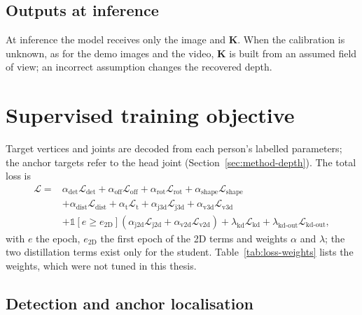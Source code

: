 \subsection{Outputs at inference}
\label{sec:method-inference}

At inference the model receives only the image and $\mathbf K$. When the calibration is unknown, as for the
demo images and the video, $\mathbf K$ is built from an assumed field of view; an incorrect assumption changes
the recovered depth.

\section{Supervised training objective}
\label{sec:method-losses}

Target vertices and joints are decoded from each person's labelled parameters; the anchor targets refer to the head
joint (Section~\ref{sec:method-depth}). The total loss is
\begin{equation}
\begin{split}
 \mathcal{L}={}&\alpha_{\text{det}}\mathcal{L}_{\text{det}}+\alpha_{\text{off}}\mathcal{L}_{\text{off}}
 +\alpha_{\text{rot}}\mathcal{L}_{\text{rot}}+\alpha_{\text{shape}}\mathcal{L}_{\text{shape}}\\
 &+\alpha_{\text{dist}}\mathcal{L}_{\text{dist}}+\alpha_{\text{t}}\mathcal{L}_{\text{t}}
 +\alpha_{\text{j3d}}\mathcal{L}_{\text{j3d}}+\alpha_{\text{v3d}}\mathcal{L}_{\text{v3d}}\\
 &+\mathbb{1}[e\ge e_{\text{2D}}]\left(\alpha_{\text{j2d}}\mathcal{L}_{\text{j2d}}
 +\alpha_{\text{v2d}}\mathcal{L}_{\text{v2d}}\right)
 +\lambda_{\text{kd}}\mathcal{L}_{\text{kd}}+\lambda_{\text{kd-out}}\mathcal{L}_{\text{kd-out}},
\end{split}
\label{eq:method-loss}
\end{equation}
with $e$ the epoch, $e_{\text{2D}}$ the first epoch of the 2D terms and weights $\alpha$ and $\lambda$; the two
distillation terms exist only for the student. Table~\ref{tab:loss-weights} lists the weights, which were not tuned in
this thesis.



\subsection{Detection and anchor localisation}


